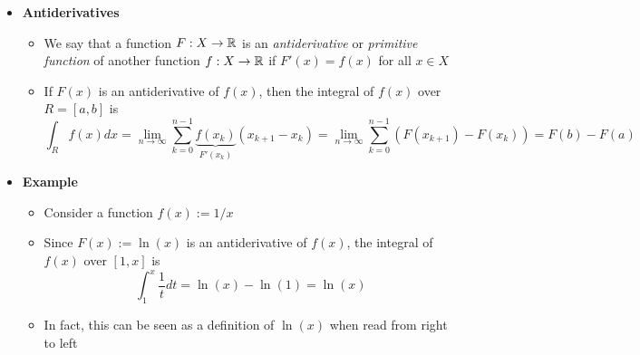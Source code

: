 \documentclass[12pt,a4paper]{article}
\begin{document}
\begin{itemize}
\item \textbf{Antiderivatives}
  \begin{itemize}
  \item We say that a function $F:X\to \mathbb{R}$ is an \emph{antiderivative} or \emph{primitive function} of another function $f:X\to\mathbb{R}$
    if $F'(x) = f(x)$ for all $x\in X$
  \item If $F(x)$ is an antiderivative of $f(x)$,
    then the integral of $f(x)$ over $R=[a,b]$ is
    \begin{equation}\nonumber%
      \int_{R}f(x)dx
      = \lim_{n\to \infty}\sum_{k=0}^{n-1}\underbrace{f(x_{k})}_{F'(x_{k})}(x_{k+1}-x_{k})
      = \lim_{n\to \infty}\sum_{k=0}^{n-1}(F(x_{k+1})-F(x_{k}))
      = F(b)-F(a)
    \end{equation}
    
  \end{itemize}

\item \textbf{Example}
  \begin{itemize}
  \item Consider a function $f(x):=1/x$
  \item Since $F(x):=\ln(x)$ is an antiderivative of $f(x)$,
    the integral of $f(x)$ over $[1,x]$ is
    \begin{equation}\nonumber%
      \int_{1}^{x}\frac{1}{t}dt
      = \ln(x) - \ln(1)
      = \ln(x)
    \end{equation}
  \item In fact, this can be seen as a definition of $\ln(x)$ when read from right to left
  \end{itemize}


\end{itemize}
\end{document}
